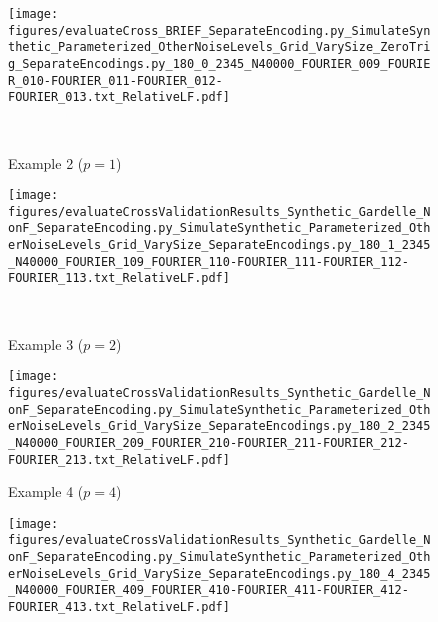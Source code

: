 \documentclass[si.tex]{subfiles}
\begin{document}
\begin{figure}
\begin{minipage}[b]{0.45\linewidth}
\texttt{[image: figures/evaluateCross\_BRIEF\_SeparateEncoding.py\_SimulateSynthetic\_Parameterized\_OtherNoiseLevels\_Grid\_VarySize\_ZeroTrig\_SeparateEncodings.py\_180\_0\_2345\_N40000\_FOURIER\_009\_FOURIER\_010-FOURIER\_011-FOURIER\_012-FOURIER\_013.txt\_RelativeLF.pdf]}

\ 

Example 2 ($p=1$)





\texttt{[image: figures/evaluateCrossValidationResults\_Synthetic\_Gardelle\_NonF\_SeparateEncoding.py\_SimulateSynthetic\_Parameterized\_OtherNoiseLevels\_Grid\_VarySize\_SeparateEncodings.py\_180\_1\_2345\_N40000\_FOURIER\_109\_FOURIER\_110-FOURIER\_111-FOURIER\_112-FOURIER\_113.txt\_RelativeLF.pdf]}


\ 

Example 3 ($p=2$)

\texttt{[image: figures/evaluateCrossValidationResults\_Synthetic\_Gardelle\_NonF\_SeparateEncoding.py\_SimulateSynthetic\_Parameterized\_OtherNoiseLevels\_Grid\_VarySize\_SeparateEncodings.py\_180\_2\_2345\_N40000\_FOURIER\_209\_FOURIER\_210-FOURIER\_211-FOURIER\_212-FOURIER\_213.txt\_RelativeLF.pdf]}


  \end{minipage}%
  \hfill
  \begin{minipage}[b]{0.45\linewidth}
    \centering


Example 4 ($p=4$)

\texttt{[image: figures/evaluateCrossValidationResults\_Synthetic\_Gardelle\_NonF\_SeparateEncoding.py\_SimulateSynthetic\_Parameterized\_OtherNoiseLevels\_Grid\_VarySize\_SeparateEncodings.py\_180\_4\_2345\_N40000\_FOURIER\_409\_FOURIER\_410-FOURIER\_411-FOURIER\_412-FOURIER\_413.txt\_RelativeLF.pdf]}


\end{minipage}
\end{figure}
\end{document}
